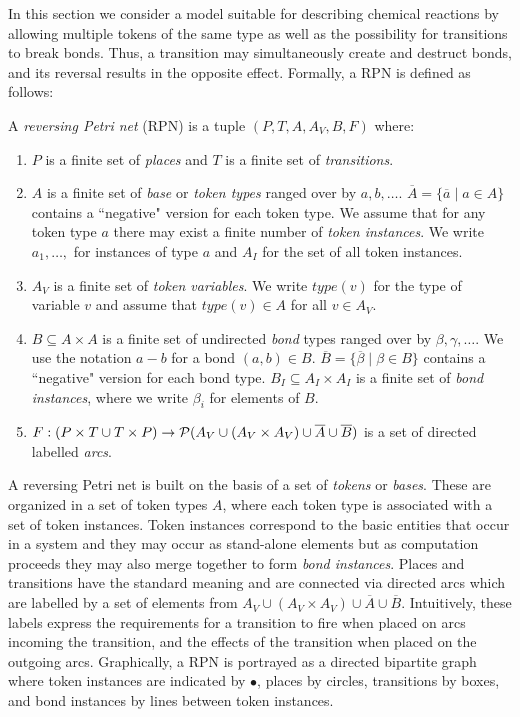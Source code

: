 \documentclass[runningheads]{llncs}
\newcommand{\PN}{reversing Petri net }
\newcommand{\bond}{\!-\!}
\newcommand{\type}{\mathit{type}}
\begin{document}
In this section we consider
a model suitable for describing chemical reactions by allowing multiple tokens of the same type as well as the possibility for 
transitions to break bonds. Thus, a transition may simultaneously create
and destruct bonds, and its reversal results in the opposite effect. Formally, a RPN
is defined as follows:
\begin{definition}{\rm
		A \emph{\PN}(RPN) is a tuple $(P,T,  A, A_V, B, F)$ where:
		\begin{enumerate}
			\item $P$ is a finite set of \emph{places} and
			$T$ is a finite set of \emph{transitions}.
			\item $A$ is a finite set of \emph{base} or \emph{token types} ranged over by $a, b,\ldots$.
			$\overline{A} = 
			\{\overline{a}\mid a\in A\}$ contains a ``negative"  version for each token type. We assume that
			for any token type $a$ there may exist a finite number of \emph{token instances}. 
			We write $a_1,\ldots,$ for
			instances of type $a$ and $A_I$ for the set of all token instances. 
			\item $A_V$ is a finite set of \emph{token variables}. We write $\type(v)$ for the type
			of variable $v$ and assume that $\type(v) \in A$ for all $v\in A_V$.
			\item $B\subseteq A\times A$ is a finite set of undirected \emph{bond} types ranged over
			by $\beta,\gamma,\ldots$. We use the notation $a \bond b$ for a bond $(a,b)\in B$.  
			$\overline{B} = \{\overline{\beta}\mid \beta\in B\}$ contains a ``negative" version for 
			each bond type. $B_I\subseteq A_I\times A_I$ is a finite set of \emph{bond instances},
			where we write $\beta_i$ 
			for elements of $B$.
			\item $F : (P\times T  \cup T \times P)\rightarrow {\cal P}( A_V \cup (A_V \times A_V) \cup \overline{A}
			\cup \overline{B}) $ 
			is a set of directed labelled \emph{arcs}.
		\end{enumerate}
}\end{definition}

A reversing Petri net is built on the basis of a set of \emph{tokens} or \emph{bases}. These
are organized in a set of token types $A$, where each token type is associated with a set of token instances.
Token instances correspond to the basic entities that occur in a system and they may occur as 
stand-alone elements but as computation proceeds they may also merge together to form \emph{bond 
	instances}. 
Places and transitions have the standard meaning and are connected
via directed arcs which are labelled by a set of elements from $A_V \cup (A_V \times A_V) \cup \overline{A}
\cup \overline{B}$.  Intuitively, these labels express the requirements for a transition
to fire when placed on arcs incoming the transition, and the effects of the transition when placed on the
outgoing arcs. 
Graphically, a RPN is portrayed as a directed bipartite graph where token instances are indicated by $\bullet$, places by
circles, transitions by boxes, and bond instances by lines between token instances. 
\end{document}
